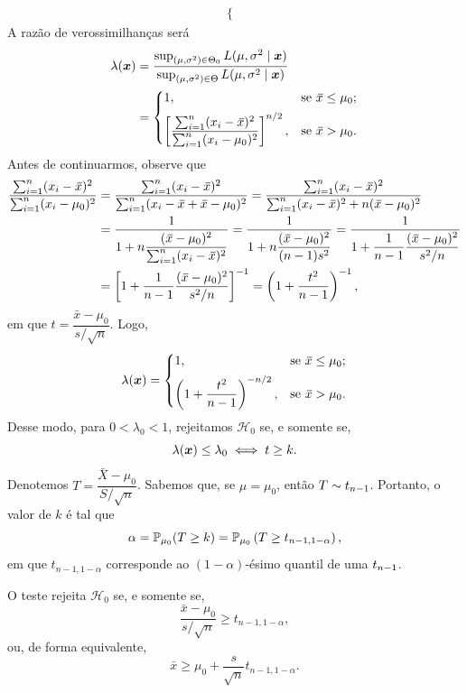 \begin{theorem}
\begin{align}
\begin{cases}
\end{cases}
\end{align}
A razão de verossimilhanças será
\begin{align}
\lambda(\v{x}) &= \frac{\sup_{(\mu,\sigma^2)\in\Theta_0}L(\mu,\sigma^2\mid\v{x})}{\sup_{(\mu,\sigma^2)\in\Theta}L(\mu,\sigma^2\mid\v{x})}\notag\\
&= \begin{cases}
1, & \text{se } \bar{x}\leq\mu_0;\\[1ex]
\left[\dfrac{\sum_{i=1}^n(x_i-\bar{x})^2}{\sum_{i=1}^n(x_i-\mu_0)^2}\right]^{n/2}, & \text{se } \bar{x}>\mu_0.
\end{cases}
\end{align}
Antes de continuarmos, observe que
\begin{align}
\frac{\sum_{i=1}^n(x_i-\bar{x})^2}{\sum_{i=1}^n(x_i-\mu_0)^2} &= \frac{\sum_{i=1}^n(x_i-\bar{x})^2}{\sum_{i=1}^n(x_i-\bar{x}+\bar{x}-\mu_0)^2} = \frac{\sum_{i=1}^n(x_i-\bar{x})^2}{\sum_{i=1}^n(x_i-\bar{x})^2+n(\bar{x}-\mu_0)^2}\notag\\
&= \frac{1}{1+n\dfrac{(\bar{x}-\mu_0)^2}{\sum_{i=1}^n(x_i-\bar{x})^2}} = \frac{1}{1+n\dfrac{(\bar{x}-\mu_0)^2}{(n-1)s^2}} = \frac{1}{1+\dfrac{1}{n-1}\dfrac{(\bar{x}-\mu_0)^2}{s^2/n}}\notag\\
&= \left[1+\frac{1}{n-1}\frac{(\bar{x}-\mu_0)^2}{s^2/n}\right]^{-1} = \left(1+\frac{t^2}{n-1}\right)^{-1},
\end{align}
em que $t=\dfrac{\bar{x}-\mu_0}{s/\sqrt{n}}$. Logo,
\begin{equation}
\lambda(\v{x}) = \begin{cases}
1, & \text{se } \bar{x}\leq\mu_0;\\[1ex]
\left(1+\dfrac{t^2}{n-1}\right)^{-n/2}, & \text{se } \bar{x}>\mu_0.
\end{cases}
\end{equation}
Desse modo, para $0<\lambda_0<1$, rejeitamos $\mathcal{H}_0$ se, e somente se,
\begin{equation}
\lambda(\v{x})\leq\lambda_0 \iff t\geq k.
\end{equation}
Denotemos $T=\dfrac{\bar{X}-\mu_0}{S/\sqrt{n}}$. Sabemos que, se $\mu=\mu_0$, então $T\sim\tdist{n-1}$. Portanto, o valor de $k$ é tal que
\begin{equation}
\alpha=\P_{\mu_0}(T\geq k)=\P_{\mu_0}\left(T\geq t_{n-1,1-\alpha}\right),
\end{equation}
em que $t_{n-1,1-\alpha}$ corresponde ao $(1-\alpha)$-ésimo quantil de uma $\tdist{n-1}$.

O teste rejeita $\mathcal{H}_0$ se, e somente se,
\begin{equation}
\frac{\bar{x}-\mu_0}{s/\sqrt{n}}\geq t_{n-1,1-\alpha},
\end{equation}
ou, de forma equivalente,
\begin{equation}
\bar{x}\geq\mu_0+\frac{s}{\sqrt{n}}t_{n-1,1-\alpha}.
\end{equation}
\end{theorem}

